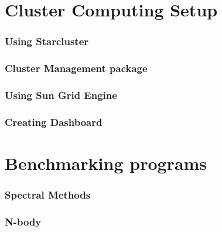 \documentclass[12pt,a4paper]{report}
\begin{document}
\appendix

\chapter{Cluster Computing Setup}
\subsection{Using Starcluster}
\subsection{Cluster Management package}
\subsection{Using Sun Grid Engine}
\subsection{Creating Dashboard}
\chapter{Benchmarking  programs}
\subsection{Spectral Methods}
\subsection{N-body}



\end{document}
